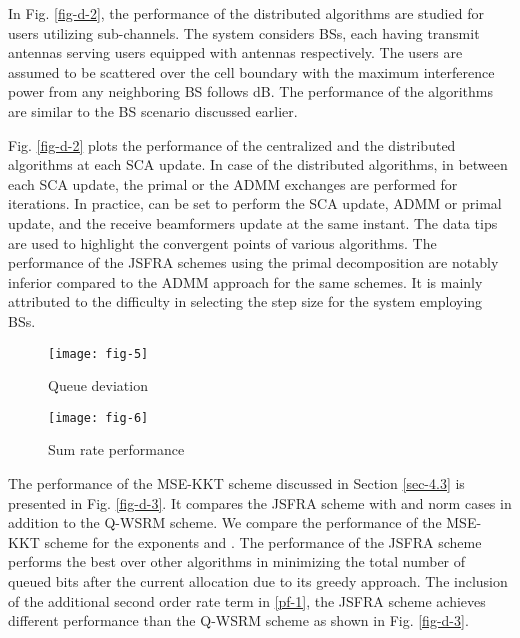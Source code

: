 In Fig. \ref{fig-d-2}, the performance of the distributed algorithms are studied for  users utilizing  sub-channels. The system considers  \acp{BS}, each having  transmit antennas serving  users equipped with  antennas respectively. The users are assumed to be scattered over the cell boundary with the maximum interference power from any neighboring \ac{BS} follows  dB. The performance of the algorithms are similar to the  \ac{BS} scenario discussed earlier.

Fig. \ref{fig-d-2} plots the performance of the centralized and the distributed algorithms at each \ac{SCA} update. In case of the distributed algorithms, in between each \ac{SCA} update, the primal or the \ac{ADMM} exchanges are performed for  iterations. In practice,  can be set to perform the \ac{SCA} update, \ac{ADMM} or primal update, and the receive beamformers  update at the same instant. The data tips are used to highlight the convergent points of various algorithms. The performance of the \ac{JSFRA} schemes using the primal decomposition are notably inferior compared to the \ac{ADMM} approach for the same schemes. It is mainly attributed to the difficulty in selecting the step size for the system employing  \acp{BS}.
\begin{figure*}
\centering
\begin{subfigure}{0.49\textwidth}
\texttt{[image: fig-5]}
\caption{Queue deviation}
\end{subfigure}
\hfill
\begin{subfigure}{0.49\textwidth}
\texttt{[image: fig-6]}
\caption{Sum rate performance}
\end{subfigure}
\caption{Convergence plot for  model}
\label{fig-d-2}
\end{figure*}

The performance of the \ac{MSE}-\ac{KKT} scheme discussed in Section \ref{sec-4.3} is presented in Fig. \ref{fig-d-3}. It compares the \ac{JSFRA} scheme with  and  norm cases in addition to the \ac{Q-WSRM} scheme. We compare the performance of the \ac{MSE}-\ac{KKT} scheme for the exponents  and . The performance of the  \ac{JSFRA} scheme performs the best over other algorithms in minimizing the total number of queued bits after the current allocation due to its greedy approach. The inclusion of the additional second order rate term in \eqref{pf-1}, the  \ac{JSFRA} scheme achieves different performance than the \ac{Q-WSRM} scheme as shown in Fig. \ref{fig-d-3}. 

